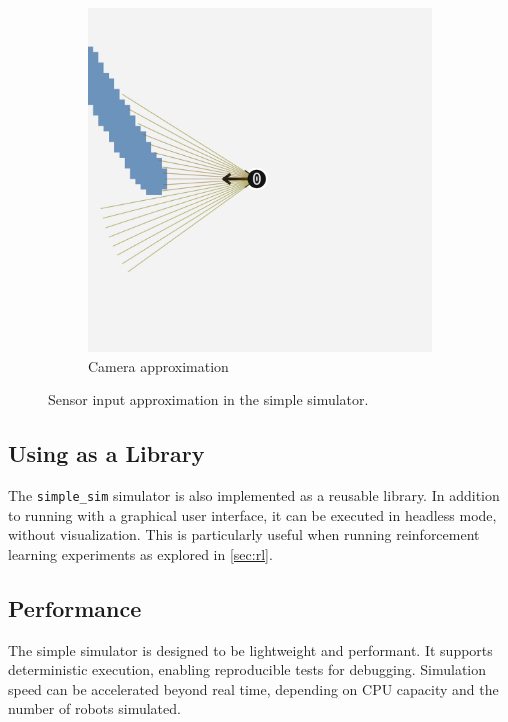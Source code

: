 \begin{figure}[H]
\begin{subfigure}[b]{0.45\textwidth}
        \includegraphics[width=\textwidth]{figures/screenshots/simple-camera.png}
        \caption{Camera approximation}
        \label{fig:camera-approximation}
    \end{subfigure}
    \caption{Sensor input approximation in the simple simulator.}
    \label{fig:sensor-approximation}
\end{figure}

\subsection{Using as a Library}
The \texttt{simple\_sim} simulator is also implemented as a reusable library. In addition to running with a graphical user interface, it can be executed in headless mode, without visualization. This is particularly useful when running reinforcement learning experiments as explored in \cref{sec:rl}.


\subsection{Performance} 
The simple simulator is designed to be lightweight and performant. It supports deterministic execution, enabling reproducible tests for debugging. Simulation speed can be accelerated beyond real time, depending on CPU capacity and the number of robots simulated. \\

